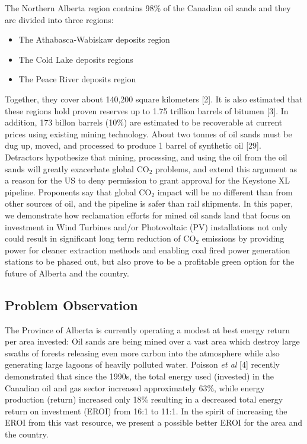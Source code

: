 \documentclass[11pt]{article}
\begin{document}
The Northern Alberta region contains 98\% of the Canadian oil sands and they are divided into three regions:
\begin{itemize}
\item The Athabasca-Wabiskaw deposits region
\item The Cold Lake deposits regions 
\item The Peace River deposits region
\end{itemize}

Together, they cover about 140,200 square kilometers [2]. It is also estimated that these regions hold proven reserves up to 1.75 trillion barrels of bitumen [3]. In addition, 173 billon barrels (10\%) are estimated to be recoverable at current prices using existing mining technology. About two tonnes of oil sands must be dug up, moved, and processed to produce 1 barrel of synthetic oil [29].  \\

Detractors hypothesize that mining, processing, and using the oil from the oil sands will greatly exacerbate global CO$_2$ problems, and extend this argument as a reason for the US to deny permission to grant approval for the Keystone XL pipeline. Proponents say that global CO$_2$ impact will be no different than from other sources of oil, and the pipeline is safer than rail shipments. In this paper, we demonstrate how reclamation efforts for mined oil sands land that focus on investment in Wind Turbines and/or Photovoltaic (PV) installations not only could result in significant long term reduction of CO$_2$ emissions by providing power for cleaner extraction methods and enabling coal fired power generation stations to be phased out, but also prove to be a profitable green option for the future of Alberta and the country. 

\subsection{Problem Observation}

The Province of Alberta is currently operating a modest at best energy return per area invested: Oil sands are being mined over a vast area which destroy large swaths of forests releasing even more carbon into the atmosphere while also generating large lagoons of heavily polluted water. Poisson \emph{et al } [4] recently demonstrated that since the 1990s, the total energy used (invested) in the Canadian oil and gas sector increased approximately 63\%, while energy production (return) increased only 18\% resulting in a decreased total energy return on investment (EROI) from 16:1 to 11:1.   In the spirit of increasing the EROI from this vast resource, we present a possible better EROI for the area and the country.  \\
\end{document}
